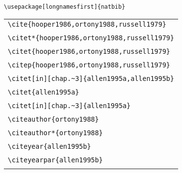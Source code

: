 \documentclass{article}
\begin{document}
\verb#\usepackage[longnamesfirst]{natbib}#\\

\begin{center}
\begin{tabular}{l}
\verb#\cite{hooper1986,ortony1988,russell1979}# \\
\cite{hooper1986,ortony1988,russell1979}  \\\hline 
\verb#\citet*{hooper1986,ortony1988,russell1979}# \\
 \citet*{hooper1986,ortony1988,russell1979}  \\\hline
\verb#\citet{hooper1986,ortony1988,russell1979}# \\
 \citet{hooper1986,ortony1988,russell1979}  \\\hline
\verb#\citep{hooper1986,ortony1988,russell1979}# \\
 \citep{hooper1986,ortony1988,russell1979}  \\\hline
\verb#\citet[in][chap.~3]{allen1995a,allen1995b}# \\
 \citet[in][chap.~3]{allen1995a,allen1995b} \\\hline
\verb#\citet{allen1995a}# \\
 \citet{allen1995a} \\\hline
\verb#\citet[in][chap.~3]{allen1995a}# \\
 \citet[in][chap.~3]{allen1995a} \\\hline
\verb#\citeauthor{ortony1988}# \\
 \citeauthor{ortony1988} \\\hline
\verb#\citeauthor*{ortony1988}# \\
 \citeauthor*{ortony1988} \\\hline
\verb#\citeyear{allen1995b}# \\
 \citeyear{allen1995b} \\\hline
\verb#\citeyearpar{allen1995b}# \\
 \citeyearpar{allen1995b} \\\hline
\end{tabular}
\end{center}
\end{document}
